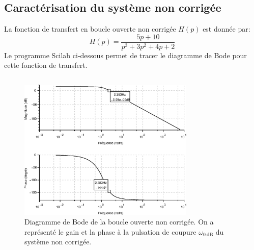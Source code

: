 \subsection*{Caractérisation du système non corrigée}
La fonction de transfert en boucle ouverte non corrigée $H(p)$ est donnée par:
\[
    H(p)=\dfrac{5p+10}{p^3+3p^2+4p+2}
\]
Le programme Scilab ci-dessous permet de tracer le diagramme de Bode pour cette
fonction de transfert.
\inputminted{scilab}{codes/scilab/code_q1_chap_correction.sce}
\begin{figure}
    \centering
    \includegraphics[width=0.75\textwidth]{fig/chap_correction/bode_BONC.eps}
    \caption{Diagramme de Bode de la boucle ouverte non corrigée. 
             On a représenté le gain et la phase à la pulsation de coupure 
             $\omega_{\SI{0}{\dB}}$ du système non corrigée.}
\end{figure}
